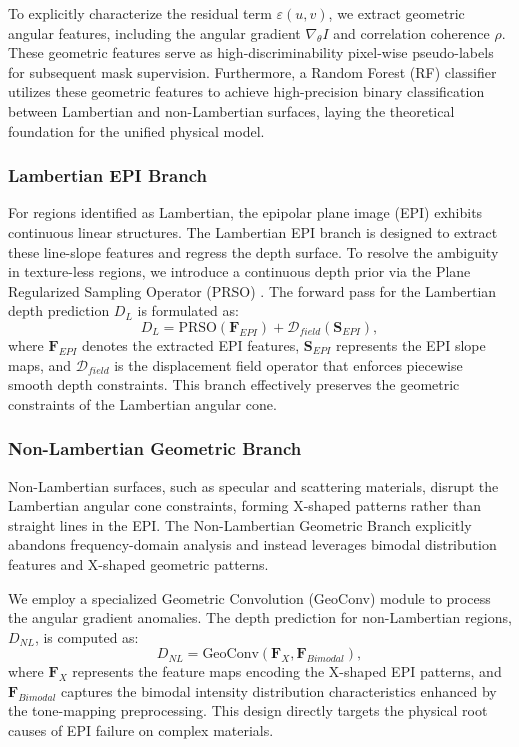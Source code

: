 \documentclass[lettersize,journal]{IEEEtran}
\begin{document}
To explicitly characterize the residual term $\varepsilon(u,v)$, we extract geometric angular features, including the angular gradient $\nabla_{\theta} I$ and correlation coherence $\rho$. These geometric features serve as high-discriminability pixel-wise pseudo-labels for subsequent mask supervision. Furthermore, a Random Forest (RF) classifier utilizes these geometric features to achieve high-precision binary classification between Lambertian and non-Lambertian surfaces, laying the theoretical foundation for the unified physical model.

\subsubsection{Lambertian EPI Branch}
For regions identified as Lambertian, the epipolar plane image (EPI) exhibits continuous linear structures. The Lambertian EPI branch is designed to extract these line-slope features and regress the depth surface. To resolve the ambiguity in texture-less regions, we introduce a continuous depth prior via the Plane Regularized Sampling Operator (PRSO) \cite{wang2022prso}. The forward pass for the Lambertian depth prediction $D_L$ is formulated as:
\begin{equation}
    D_L = \text{PRSO}(\mathbf{F}_{EPI}) + \mathcal{D}_{field}(\mathbf{S}_{EPI}),
    \label{eq:ch3_2}
\end{equation}
where $\mathbf{F}_{EPI}$ denotes the extracted EPI features, $\mathbf{S}_{EPI}$ represents the EPI slope maps, and $\mathcal{D}_{field}$ is the displacement field operator that enforces piecewise smooth depth constraints. This branch effectively preserves the geometric constraints of the Lambertian angular cone.

\subsubsection{Non-Lambertian Geometric Branch}
Non-Lambertian surfaces, such as specular and scattering materials, disrupt the Lambertian angular cone constraints, forming X-shaped patterns rather than straight lines in the EPI. The Non-Lambertian Geometric Branch explicitly abandons frequency-domain analysis and instead leverages bimodal distribution features and X-shaped geometric patterns. 

We employ a specialized Geometric Convolution (GeoConv) module to process the angular gradient anomalies. The depth prediction for non-Lambertian regions, $D_{NL}$, is computed as:
\begin{equation}
    D_{NL} = \text{GeoConv}(\mathbf{F}_{X}, \mathbf{F}_{Bimodal}),
    \label{eq:ch3_3}
\end{equation}
where $\mathbf{F}_{X}$ represents the feature maps encoding the X-shaped EPI patterns, and $\mathbf{F}_{Bimodal}$ captures the bimodal intensity distribution characteristics enhanced by the tone-mapping preprocessing. This design directly targets the physical root causes of EPI failure on complex materials.
\end{document}
